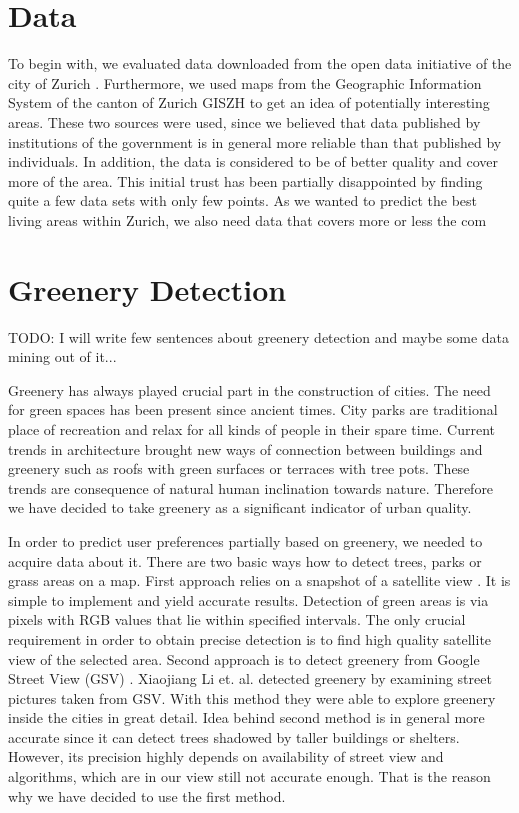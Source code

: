 \documentclass[letterpaper]{article}
\begin{document}
\section{Data}
To begin with, we evaluated data downloaded from the open data initiative of the city of Zurich \cite{ZurichOD}. Furthermore, we used maps from the Geographic Information System of the canton of Zurich GISZH \cite{GISZH} to get an idea of potentially interesting areas.
These two sources were used, since we believed that data published by institutions of the government is in general more reliable than that published by individuals. In addition, the data is considered to be of better quality and cover more of the area. This initial trust has been partially disappointed by finding quite a few data sets with only few points.
As we wanted to predict the best living areas within Zurich, we also need data that covers more or less the com

\section{Greenery Detection}\label{sec:greenery}
TODO: I will write few sentences about greenery detection and maybe some data mining out of it...

\indent Greenery has always played crucial part in the construction of cities. The need for green spaces has been present since ancient times.
City parks are traditional place of recreation and relax for all kinds of people in their spare time. Current trends in architecture brought new ways of
connection between buildings and greenery such as roofs with green surfaces or terraces with tree pots. These trends are consequence of natural human inclination towards nature. Therefore we have decided to take greenery as a significant indicator of urban quality.

\indent In order to predict user preferences partially based on greenery, we needed to acquire data about it. There are two basic ways how to detect trees, parks or grass areas on a map. First approach relies on a snapshot of a satellite view \cite{smartCities}. It is simple to implement and yield accurate results. Detection of green areas is via pixels with RGB values that lie within specified intervals. The only crucial requirement in order to obtain precise detection is to find high quality satellite view of the selected area.
Second approach is to detect greenery from Google Street View (GSV) \cite{googleView}. Xiaojiang Li et. al. detected greenery by examining street
pictures taken from GSV. With this method they were able to explore greenery inside the cities in great detail. Idea behind second method is in general
more accurate since it can detect trees shadowed by taller buildings or shelters. However, its precision highly depends on availability of street view and
algorithms, which are in our view still not accurate enough. That is the reason why we have decided to use the first method.
\end{document}
